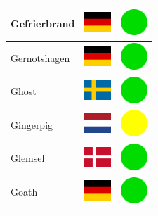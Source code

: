\documentclass[12pt, a4paper, twoside]{report}
\begin{document}
\begin{center}
\begin{longtable}{|p{5cm}|p{2cm}|p{2cm}|}
 Gefrierbrand                                               & \includegraphics[width=1cm]{../img/flags/de} &   \includegraphics[width=1cm]{../likes/y} \\ \hline
 Gernotshagen                                               & \includegraphics[width=1cm]{../img/flags/de} &   \includegraphics[width=1cm]{../likes/y} \\ \hline
 Ghost                                                      & \includegraphics[width=1cm]{../img/flags/se} &   \includegraphics[width=1cm]{../likes/y} \\ \hline
 Gingerpig                                                  & \includegraphics[width=1cm]{../img/flags/nl} &   \includegraphics[width=1cm]{../likes/m} \\ \hline
 Glemsel                                                    & \includegraphics[width=1cm]{../img/flags/dk} &   \includegraphics[width=1cm]{../likes/y} \\ \hline
 Goath                                                      & \includegraphics[width=1cm]{../img/flags/de} &   \includegraphics[width=1cm]{../likes/y} \\ \hline

\end{longtable}
\end{center}
\end{document}
